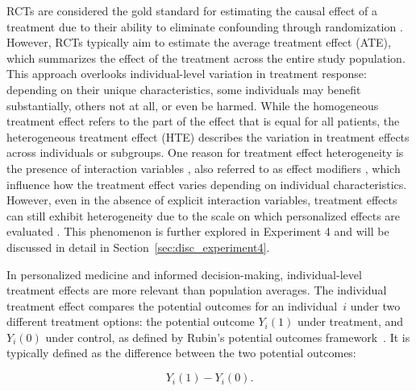 





RCTs are considered the gold standard for estimating the causal effect of a treatment due to their ability to eliminate confounding through randomization \citep{little2000}. However, RCTs typically aim to estimate the average treatment effect (ATE), which summarizes the effect of the treatment across the entire study population. This approach overlooks individual-level variation in treatment response: depending on their unique characteristics, some individuals may benefit substantially, others not at all, or even be harmed. While the homogeneous treatment effect refers to the part of the effect that is equal for all patients, the heterogeneous treatment effect (HTE) describes the variation in treatment effects across individuals or subgroups. One reason for treatment effect heterogeneity is the presence of interaction variables \citep{hoogland2021}, also referred to as effect modifiers \citep{christensen2021}, which influence how the treatment effect varies depending on individual characteristics. However, even in the absence of explicit interaction variables, treatment effects can still exhibit heterogeneity due to the scale on which personalized effects are evaluated \citep{hoogland2021}. This phenomenon is further explored in Experiment 4 and will be discussed in detail in Section~\ref{sec:disc_experiment4}.

In personalized medicine and informed decision-making, individual-level treatment effects are more relevant than population averages. The individual treatment effect compares the potential outcomes for an individual~$i$ under two different treatment options: the potential outcome $Y_i(1)$ under treatment, and $Y_i(0)$ under control, as defined by Rubin's potential outcomes framework~\citep{rubin2005}. It is typically defined as the difference between the two potential outcomes:

\begin{equation}
Y_i(1) - Y_i(0).
\end{equation}

